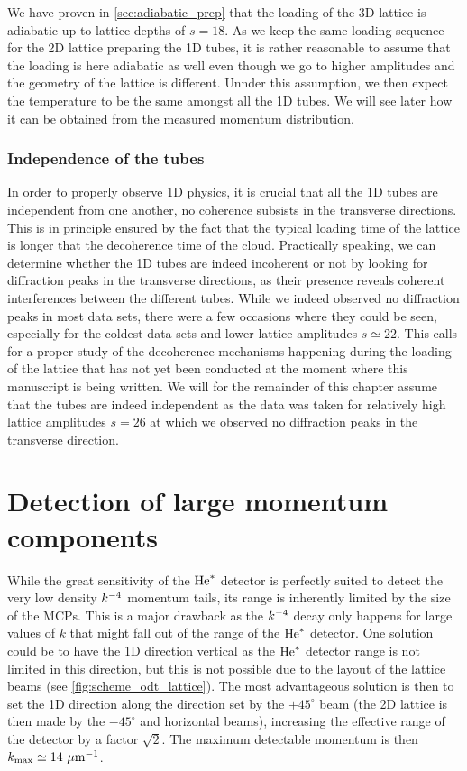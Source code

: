 We have proven in \ref{sec:adiabatic_prep} that the loading of the 3D lattice is adiabatic up to lattice depths of $s=18$. As we keep the same loading sequence for the 2D lattice preparing the 1D tubes, it is rather reasonable to assume that the loading is here adiabatic as well even though we go to higher amplitudes and the geometry of the lattice is different. Unnder this assumption, we then expect the temperature to be the same amongst all the 1D tubes. We will see later how it can be obtained from the measured momentum distribution.

\subsubsection{Independence of the tubes}


In order to properly observe 1D physics, it is crucial that all the 1D tubes are independent from one another, \ie no coherence subsists in the transverse directions. This is in principle ensured by the fact that the typical loading time of the lattice is longer that the decoherence time of the cloud. Practically speaking, we can determine whether the 1D tubes are indeed incoherent or not by looking for diffraction peaks in the transverse directions, as their presence reveals coherent interferences between the different tubes. While we indeed observed no diffraction peaks in most data sets, there were a few occasions where they could be seen, especially for the coldest data sets and lower lattice amplitudes $s \simeq 22$. This calls for a proper study of the decoherence mechanisms happening during the loading of the lattice that has not yet been conducted at the moment where this manuscript is being written. We will for the remainder of this chapter assume that the tubes are indeed independent as the data was taken for relatively high lattice amplitudes $s=26$ at which we observed no diffraction peaks in the transverse direction.

\section{Detection of large momentum components}

\label{sec:large_momentum_detection}

While the great sensitivity of the $\mathrm{He}^*$ detector is perfectly suited to detect the very low density $k^{-4}$ momentum tails, its range is inherently limited by the size of the MCPs. This is a major drawback as the $k^{-4}$ decay only happens for large values of $k$ that might fall out of the range of the $\mathrm{He}^*$ detector. One solution could be to have the 1D direction vertical as the $\mathrm{He}^*$ detector range is not limited in this direction, but this is not possible due to the layout of the lattice beams (see \ref{fig:scheme_odt_lattice}). The most advantageous solution is then to set the 1D direction along the direction set by the $+45^{\circ}$ beam (the 2D lattice is then made by the $-45^{\circ}$ and horizontal beams), increasing the effective range of the detector by a factor $\sqrt{2}$. The maximum detectable momentum is then $k_{\rm{max}} \simeq 14 \ \mu \rm{m}^{-1}$.

